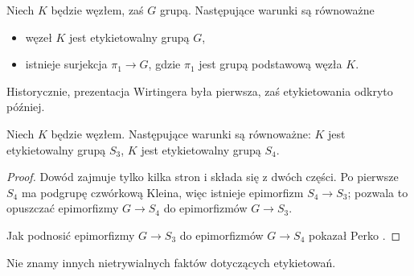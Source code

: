 \begin{proposition}
    Niech $K$ będzie węzłem, zaś $G$ grupą.
    Następujące warunki są równoważne
    \begin{itemize}
        \item węzeł $K$ jest etykietowalny grupą $G$,
        \item istnieje surjekcja $\pi_1 \to G$, gdzie $\pi_1$ jest grupą podstawową węzła $K$.
    \end{itemize}
\end{proposition}

Historycznie, prezentacja Wirtingera była pierwsza, zaś etykietowania odkryto później.

\begin{proposition}[Perko]
    Niech $K$ będzie węzłem.
    Następujące warunki są równoważne: $K$ jest etykietowalny grupą $S_3$, $K$ jest etykietowalny grupą $S_4$.
\end{proposition}

\begin{proof}
    Dowód zajmuje tylko kilka stron i składa się z dwóch części.
    Po pierwsze $S_4$ ma podgrupę czwórkową Kleina, więc istnieje epimorfizm $S_4 \to S_3$; pozwala to opuszczać epimorfizmy $G \to S_4$ do epimorfizmów $G \to S_3$.
    
    Jak podnosić epimorfizmy $G \to S_3$ do epimorfizmów $G \to S_4$ pokazał Perko \cite{perko1975}.
\end{proof}

Nie znamy innych nietrywialnych faktów dotyczących etykietowań.

%

